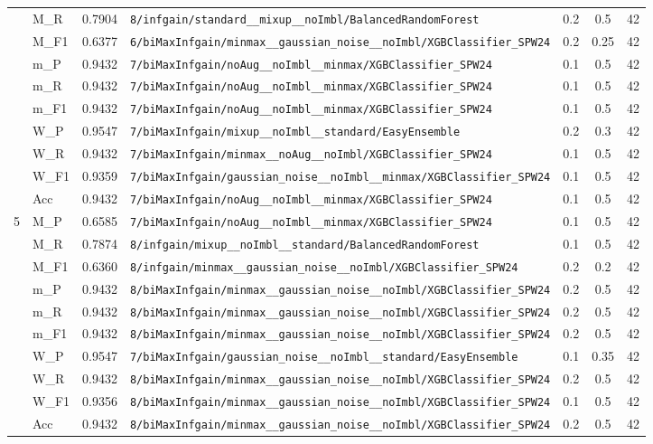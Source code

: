 \begin{table}[htbp]
\begin{tabular}{|c|l|c|>{\ttfamily\footnotesize}p{7.2cm}|c|c|c|}
 & M\_R & 0.7904 & \texttt{8/infgain/standard\_\_mixup\_\_noImbl/BalancedRandomForest} & 0.2 & 0.5  & 42 \\ 
 & M\_F1 & 0.6377 & \texttt{6/biMaxInfgain/minmax\_\_gaussian\_noise\_\_noImbl/XGBClassifier\_SPW24} & 0.2 & 0.25  & 42 \\ 
 & m\_P & 0.9432 & \texttt{7/biMaxInfgain/noAug\_\_noImbl\_\_minmax/XGBClassifier\_SPW24} & 0.1 & 0.5  & 42 \\ 
 & m\_R & 0.9432 & \texttt{7/biMaxInfgain/noAug\_\_noImbl\_\_minmax/XGBClassifier\_SPW24} & 0.1 & 0.5  & 42 \\ 
 & m\_F1 & 0.9432 & \texttt{7/biMaxInfgain/noAug\_\_noImbl\_\_minmax/XGBClassifier\_SPW24} & 0.1 & 0.5  & 42 \\ 
 & W\_P & 0.9547 & \texttt{7/biMaxInfgain/mixup\_\_noImbl\_\_standard/EasyEnsemble} & 0.2 & 0.3  & 42 \\ 
 & W\_R & 0.9432 & \texttt{7/biMaxInfgain/minmax\_\_noAug\_\_noImbl/XGBClassifier\_SPW24} & 0.1 & 0.5  & 42 \\ 
 & W\_F1 & 0.9359 & \texttt{7/biMaxInfgain/gaussian\_noise\_\_noImbl\_\_minmax/XGBClassifier\_SPW24} & 0.1 & 0.5  & 42 \\ 
 & Acc & 0.9432 & \texttt{7/biMaxInfgain/noAug\_\_noImbl\_\_minmax/XGBClassifier\_SPW24} & 0.1 & 0.5  & 42 \\ 
\hline
\multirow{10}{*}{5} & M\_P & 0.6585 & \texttt{7/biMaxInfgain/noAug\_\_noImbl\_\_minmax/XGBClassifier\_SPW24} & 0.1 & 0.5  & 42 \\ 
 & M\_R & 0.7874 & \texttt{8/infgain/mixup\_\_noImbl\_\_standard/BalancedRandomForest} & 0.1 & 0.5  & 42 \\ 
 & M\_F1 & 0.6360 & \texttt{8/infgain/minmax\_\_gaussian\_noise\_\_noImbl/XGBClassifier\_SPW24} & 0.2 & 0.2  & 42 \\ 
 & m\_P & 0.9432 & \texttt{8/biMaxInfgain/minmax\_\_gaussian\_noise\_\_noImbl/XGBClassifier\_SPW24} & 0.2 & 0.5  & 42 \\ 
 & m\_R & 0.9432 & \texttt{8/biMaxInfgain/minmax\_\_gaussian\_noise\_\_noImbl/XGBClassifier\_SPW24} & 0.2 & 0.5  & 42 \\ 
 & m\_F1 & 0.9432 & \texttt{8/biMaxInfgain/minmax\_\_gaussian\_noise\_\_noImbl/XGBClassifier\_SPW24} & 0.2 & 0.5  & 42 \\ 
 & W\_P & 0.9547 & \texttt{7/biMaxInfgain/gaussian\_noise\_\_noImbl\_\_standard/EasyEnsemble} & 0.1 & 0.35  & 42 \\ 
 & W\_R & 0.9432 & \texttt{8/biMaxInfgain/minmax\_\_gaussian\_noise\_\_noImbl/XGBClassifier\_SPW24} & 0.2 & 0.5  & 42 \\ 
 & W\_F1 & 0.9356 & \texttt{8/biMaxInfgain/minmax\_\_gaussian\_noise\_\_noImbl/XGBClassifier\_SPW24} & 0.1 & 0.5  & 42 \\ 
 & Acc & 0.9432 & \texttt{8/biMaxInfgain/minmax\_\_gaussian\_noise\_\_noImbl/XGBClassifier\_SPW24} & 0.2 & 0.5  & 42 \\ 
\hline
\end{tabular}
\end{table}